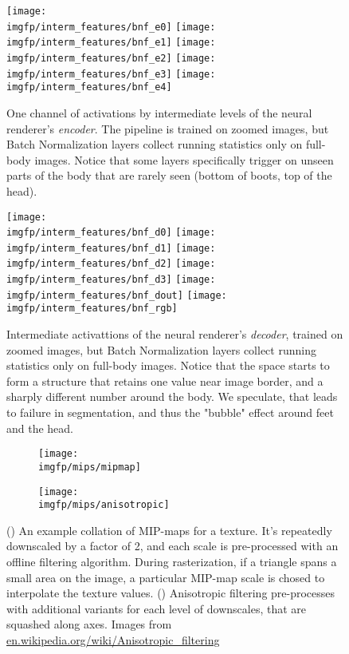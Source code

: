 \begin{figure}
	\centering
	\texttt{[image: \\imgfp/interm\_features/bnf\_e0]}%
	\hfill\texttt{[image: \\imgfp/interm\_features/bnf\_e1]}%
	\hfill\texttt{[image: \\imgfp/interm\_features/bnf\_e2]}%
	\hfill\texttt{[image: \\imgfp/interm\_features/bnf\_e3]}%
	\hfill\texttt{[image: \\imgfp/interm\_features/bnf\_e4]}%
	\caption{One channel of activations by intermediate levels of the neural renderer's \textit{encoder}. The pipeline is trained on zoomed images, but Batch Normalization layers collect running statistics only on full-body images. Notice that some layers specifically trigger on unseen parts of the body that are rarely seen (bottom of boots, top of the head).}
	\label{fig:interm06_encoder}
\end{figure}
\begin{figure}
	\centering
	\texttt{[image: \\imgfp/interm\_features/bnf\_d0]}%
	\hfill\texttt{[image: \\imgfp/interm\_features/bnf\_d1]}%
	\hfill\texttt{[image: \\imgfp/interm\_features/bnf\_d2]}%
	\hfill\texttt{[image: \\imgfp/interm\_features/bnf\_d3]}%
	\hfill\texttt{[image: \\imgfp/interm\_features/bnf\_dout]}%
	\hfill\texttt{[image: \\imgfp/interm\_features/bnf\_rgb]}%
	\caption{Intermediate activattions of the neural renderer's \textit{decoder}, trained on zoomed images, but Batch Normalization layers collect running statistics only on full-body images. Notice that the space starts to form a structure that retains one value near image border, and a sharply different number around the body. We speculate, that leads to failure in segmentation, and thus the "bubble" effect around feet and the head. }
	\label{fig:interm06_decoder}
\end{figure}
\begin{figure}
	\centering
	\begin{subfigure}[b]{0.48\textwidth}
		\centering
		\texttt{[image: \\imgfp/mips/mipmap]}%
		\caption{}
		\label{fig:mipmap}
	\end{subfigure}
	\hfill
	\begin{subfigure}[b]{0.48\textwidth}
		\centering
		\texttt{[image: \\imgfp/mips/anisotropic]}
		\caption{}
		\label{fig:anisotropic}
	\end{subfigure}
	\caption{(\protect{}) An example collation of MIP-maps for a texture. It's repeatedly downscaled by a factor of 2, and each scale is pre-processed with an offline filtering algorithm. During rasterization, if a triangle spans a small area on the image, a particular MIP-map scale is chosed to interpolate the texture values. (\protect{}) Anisotropic filtering pre-processes with additional variants for each level of downscales, that are squashed along axes. Images from \href{https://en.wikipedia.org/wiki/Anisotropic_filtering}{en.wikipedia.org/wiki/Anisotropic\_filtering}} 
\end{figure}
